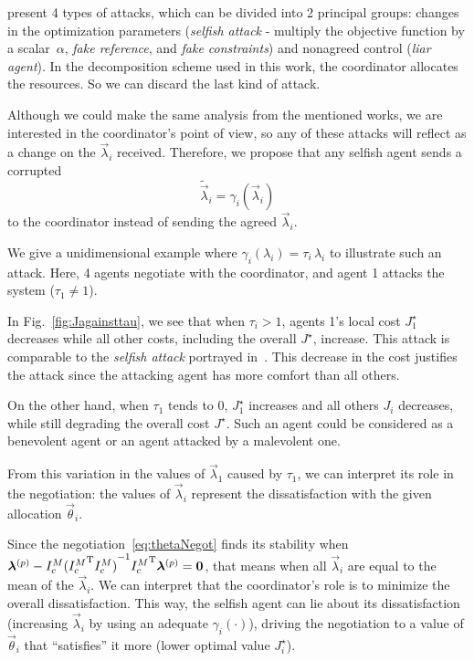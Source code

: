 \documentclass[a4paper, 10 pt, conference]{ieeeconf}  %
\begin{document}
\cite{VelardeEtAl2017,VelardeEtAl2017a,ChanfreutEtAl2018,AnandutaEtAl2020} present 4 types of attacks, which can be divided into 2 principal groups: changes in the optimization parameters (\emph{selfish attack} - multiply the objective function by a scalar~$\alpha$, \emph{fake reference}, and \emph{fake constraints}) and nonagreed control (\emph{liar agent}).
In the decomposition scheme used in this work, the coordinator allocates the resources.
So we can discard the last kind of attack.

Although we could make the same analysis from the mentioned works, we are interested in the coordinator's point of view, so any of these attacks will reflect as a change on the $\vec{\lambda}_{i}$ received.
Therefore, we propose that any selfish agent sends a
corrupted
\begin{equation}\label{eq:cheating}
\tilde{\vec{\lambda}}_{i}=\gamma_{i}(\vec{\lambda}_{i})
\end{equation}
to the coordinator instead of sending the agreed $\vec{\lambda}_{i}$.

We give a unidimensional example where ${\gamma_{i}(\lambda_{i})=\tau_{i}\,\lambda_{i}}$ to illustrate such an attack.
Here, 4 agents negotiate with the coordinator, and agent 1 attacks the system ($\tau_{1}\neq1$).

In Fig.~\ref{fig:Jagainsttau}, we see that when ${\tau_{i}>1}$, agents 1's local cost $J_{1}^{\star}$ decreases while all other costs, including the overall $J^{\star}$, increase.
This attack is comparable to the \emph{selfish attack} portrayed in~\cite{VelardeEtAl2017}.
This decrease in the cost justifies the attack since the attacking agent has more comfort than all others.


On the other hand, when $\tau_{1}$ tends to $0$, $J_{1}^{\star}$ increases and all others $J_{i}$ decreases, while still degrading the overall cost $J^{\star}$.
Such an agent could be considered as a benevolent agent or an agent attacked by a malevolent one.

From this variation in the values of $\vec{\lambda}_{1}$ caused by $\tau_{1}$, we can interpret its role in the negotiation: the values of $\vec{\lambda}_{i}$ represent the dissatisfaction with the given allocation $\vec{\theta}_{i}$.

Since the negotiation~\eqref{eq:thetaNegot} finds its stability when ${\bm{\lambda}^{(p)}-{I_{c}^M}{({I_{c}^M}^{\mathrm{T}} {I_{c}^M})}^{-1}{I_{c}^M}^{\mathrm{T}}\bm{\lambda} ^{(p)}=\bm{0}}$, that means when all $\vec{\lambda}_{i}$ are equal to the mean of the $\vec{\lambda}_{i}$.
We can interpret that the coordinator's role is to minimize the overall dissatisfaction.
This way, the selfish agent can lie about its dissatisfaction (increasing $\vec{\lambda}_{i}$ by using an adequate $\gamma_{i}(\cdot)$), driving the negotiation to a value of $\vec{\theta}_{i}$ that ``satisfies'' it more (lower optimal value $J_{i}^{\star}$).
\end{document}
